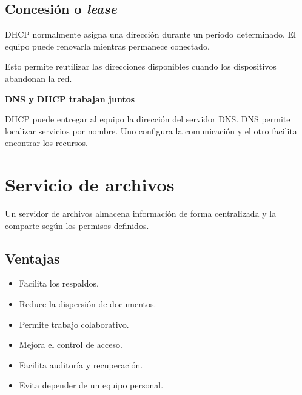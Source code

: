 \documentclass[
  spanish,
  letterpaper,
]{scrbook}
\providecommand{\tightlist}{%
  \setlength{\itemsep}{0pt}\setlength{\parskip}{0pt}}
\begin{document}
\section{\texorpdfstring{Concesión o
\emph{lease}}{Concesión o lease}}\label{concesiuxf3n-o-lease}

DHCP normalmente asigna una dirección durante un período determinado. El
equipo puede renovarla mientras permanece conectado.

Esto permite reutilizar las direcciones disponibles cuando los
dispositivos abandonan la red.

\begin{tcolorbox}[enhanced jigsaw, arc=.35mm, bottomrule=.15mm, breakable, colback=white, colframe=quarto-callout-note-color-frame, left=2mm, leftrule=.75mm, opacityback=0, rightrule=.15mm, toprule=.15mm]
\begin{minipage}[t]{5.5mm}
\textcolor{quarto-callout-note-color}{\faInfo}
\end{minipage}%
\begin{minipage}[t]{\textwidth - 5.5mm}

\vspace{-3mm}\textbf{DNS y DHCP trabajan juntos}\vspace{3mm}

DHCP puede entregar al equipo la dirección del servidor DNS. DNS permite
localizar servicios por nombre. Uno configura la comunicación y el otro
facilita encontrar los recursos.

\end{minipage}%
\end{tcolorbox}


\chapter{Servicio de archivos}\label{servicio-de-archivos}

Un servidor de archivos almacena información de forma centralizada y la
comparte según los permisos definidos.

\section{Ventajas}\label{ventajas-2}

\begin{itemize}
\tightlist
\item
  Facilita los respaldos.
\item
  Reduce la dispersión de documentos.
\item
  Permite trabajo colaborativo.
\item
  Mejora el control de acceso.
\item
  Facilita auditoría y recuperación.
\item
  Evita depender de un equipo personal.
\end{itemize}
\end{document}
